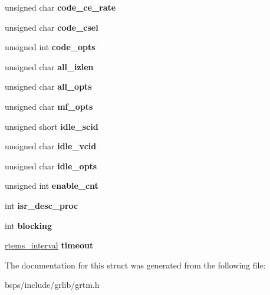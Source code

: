 \begin{DoxyCompactItemize}
unsigned char {\bfseries code\+\_\+ce\+\_\+rate}
\item 
\mbox{\label{structgrtm__ioc__config_a5d9d206def6d2aaaef0fdf472ad9a5c5}} 
unsigned char {\bfseries code\+\_\+csel}
\item 
\mbox{\label{structgrtm__ioc__config_a3e06756b0b63f02de929700251020688}} 
unsigned int {\bfseries code\+\_\+opts}
\item 
\mbox{\label{structgrtm__ioc__config_a885a3ea33a860408e145bf66a9caccb3}} 
unsigned char {\bfseries all\+\_\+izlen}
\item 
\mbox{\label{structgrtm__ioc__config_a580b538e4d3d203c9c8b07fa5ef17a27}} 
unsigned char {\bfseries all\+\_\+opts}
\item 
\mbox{\label{structgrtm__ioc__config_a8a66cc6aeeaa66d2b516ebbc89fd0a0b}} 
unsigned char {\bfseries mf\+\_\+opts}
\item 
\mbox{\label{structgrtm__ioc__config_a8fdcf20296e54748371cca17d8cd08b4}} 
unsigned short {\bfseries idle\+\_\+scid}
\item 
\mbox{\label{structgrtm__ioc__config_a1e9f4c08425f3fbd720e36d9e08ce954}} 
unsigned char {\bfseries idle\+\_\+vcid}
\item 
\mbox{\label{structgrtm__ioc__config_a55f1fb4e1aab295914dd8ba59ad91d83}} 
unsigned char {\bfseries idle\+\_\+opts}
\item 
\mbox{\label{structgrtm__ioc__config_a81fe3d2fe438d43b7d8ba15894b428b1}} 
unsigned int {\bfseries enable\+\_\+cnt}
\item 
\mbox{\label{structgrtm__ioc__config_af39e3f8100accb2f68f28cf913628513}} 
int {\bfseries isr\+\_\+desc\+\_\+proc}
\item 
\mbox{\label{structgrtm__ioc__config_a79d86c0bbe23262b5c69be953d299f6e}} 
int {\bfseries blocking}
\item 
\mbox{\label{structgrtm__ioc__config_a79b5ff4770b6161c0ef08e04606450fd}} 
\mbox{\hyperlink{group__ClassicTasks_gad39c43f949683d46874e3a5586b93aee}{rtems\+\_\+interval}} {\bfseries timeout}
\end{DoxyCompactItemize}


The documentation for this struct was generated from the following file\+:\begin{DoxyCompactItemize}
\item 
bsps/include/grlib/grtm.\+h\end{DoxyCompactItemize}
